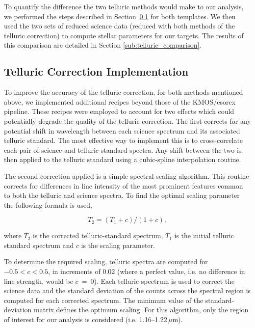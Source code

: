 To quantify the difference the two telluric methods would make to our analysis,
we performed the steps described in
Section~\ref{sub:ngc6822_telluric_correction} for both templates.
We then used the two sets of reduced science data
(reduced with both methods of the telluric correction) to compute stellar parameters for our targets.
The results of this comparison are detailed in Section
\ref{sub:telluric_comparison}.


\subsection{Telluric Correction Implementation} %
\label{sub:ngc6822_telluric_correction}

To improve the accuracy of the telluric correction,
for both methods mentioned above,
we implemented additional recipes beyond those of the KMOS/esorex pipeline.
These recipes were employed to account for two effects which could potentially degrade the quality of the telluric correction.
The first corrects for any potential shift in wavelength between each science spectrum and its associated telluric standard.
The most effective way to implement this is to cross-correlate each pair of science and telluric-standard spectra.
Any shift between the two is then applied to the telluric standard using a cubic-spline interpolation routine.

The second correction applied is a simple spectral scaling algorithm.
This routine corrects for differences in line intensity of the most prominent features common to both the telluric and science spectra.
To find the optimal scaling parameter the following formula is used,

\begin{equation} \label{eq:shiftandres}
T_{2} = (T_{1} + c) / (1 + c),
\end{equation}

\noindent where $T_{2}$ is the corrected telluric-standard spectrum,
$T_{1}$ is the initial telluric standard spectrum and $c$ is the scaling parameter.

To determine the required scaling,
telluric spectra are computed for $-0.5<c<0.5$, in increments of 0.02
(where a perfect value, i.e. no difference in line strength, would be $c$~=~0).
Each telluric spectrum is used to correct the science data and the standard deviation of the counts across the spectral region is computed for each corrected spectrum.
The minimum value of the standard-deviation matrix defines the optimum scaling.
For this algorithm, only the region of interest for our analysis is considered
(i.e. 1.16--1.22\,$\mu$m).

